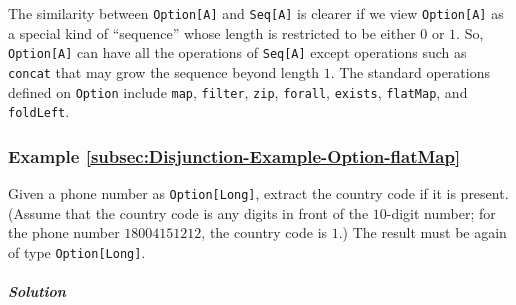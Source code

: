 The similarity between \lstinline!Option[A]! and \lstinline!Seq[A]!
is clearer if we view \lstinline!Option[A]! as a special kind of
``sequence'' whose length is restricted to be either $0$ or $1$.
So, \lstinline!Option[A]! can have all the operations of \lstinline!Seq[A]!
except operations such as \lstinline!concat! that may grow the sequence
beyond length $1$. The standard operations defined on \lstinline!Option!
include \lstinline!map!, \lstinline!filter!, \lstinline!zip!, \lstinline!forall!,
\lstinline!exists!, \lstinline!flatMap!, and \lstinline!foldLeft!.

\subsubsection{Example \label{subsec:Disjunction-Example-Option-flatMap}\ref{subsec:Disjunction-Example-Option-flatMap}}

Given a phone number as \lstinline!Option[Long]!, extract the country
code if it is present. (Assume that the country code is any digits
in front of the $10$-digit number; for the phone number $18004151212$,
the country code is $1$.) The result must be again of type \lstinline!Option[Long]!.

\subparagraph{Solution}

